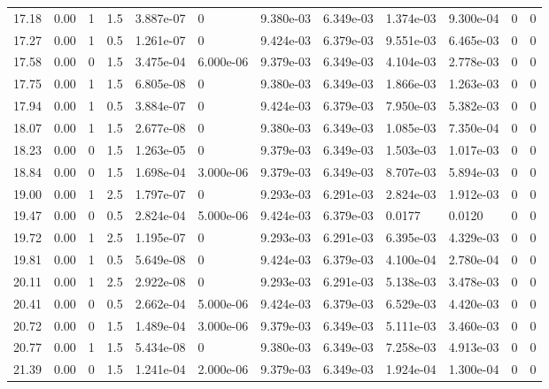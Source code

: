 \documentclass[preview]{standalone}
\begin{document}
{{{\begin{tabular}{L{1.2cm}C{1.2cm} C{0.3cm}C{0.5cm} C{1.4cm}C{1.4cm} C{1.4cm}C{1.4cm} C{1.6cm}C{1.6cm} C{1.6cm}C{1.6cm}}
  17.18  &  0.00  & 1     & 1.5 &  3.887e-07  & 0  &  9.380e-03&   6.349e-03& 1.374e-03 & 9.300e-04   &  0 & 0  \\ 
  17.27  &  0.00  & 1     & 0.5 &  1.261e-07  & 0  &  9.424e-03&   6.379e-03& 9.551e-03 & 6.465e-03   &  0 & 0  \\ 
  17.58  &  0.00  & 0     & 1.5 &  3.475e-04  & 6.000e-06  &  9.379e-03&   6.349e-03& 4.104e-03 & 2.778e-03   &  0 & 0  \\ 
  17.75  &  0.00  & 1     & 1.5 &  6.805e-08  & 0  &  9.380e-03&   6.349e-03& 1.866e-03 & 1.263e-03   &  0 & 0  \\ 
  17.94  &  0.00  & 1     & 0.5 &  3.884e-07  & 0  &  9.424e-03&   6.379e-03& 7.950e-03 & 5.382e-03   &  0 & 0  \\ 
  18.07  &  0.00  & 1     & 1.5 &  2.677e-08  & 0  &  9.380e-03&   6.349e-03& 1.085e-03 & 7.350e-04   &  0 & 0  \\ 
  18.23  &  0.00  & 0     & 1.5 &  1.263e-05  & 0  &  9.379e-03&   6.349e-03& 1.503e-03 & 1.017e-03   &  0 & 0  \\ 
  18.84  &  0.00  & 0     & 1.5 &  1.698e-04  & 3.000e-06  &  9.379e-03&   6.349e-03& 8.707e-03 & 5.894e-03   &  0 & 0  \\ 
  19.00  &  0.00  & 1     & 2.5 &  1.797e-07  & 0  &  9.293e-03&   6.291e-03& 2.824e-03 & 1.912e-03   &  0 & 0  \\ 
  19.47  &  0.00  & 0     & 0.5 &  2.824e-04  & 5.000e-06  &  9.424e-03&   6.379e-03& 0.0177 & 0.0120   &  0 & 0  \\ 
  19.72  &  0.00  & 1     & 2.5 &  1.195e-07  & 0  &  9.293e-03&   6.291e-03& 6.395e-03 & 4.329e-03   &  0 & 0  \\ 
  19.81  &  0.00  & 1     & 0.5 &  5.649e-08  & 0  &  9.424e-03&   6.379e-03& 4.100e-04 & 2.780e-04   &  0 & 0  \\ 
  20.11  &  0.00  & 1     & 2.5 &  2.922e-08  & 0  &  9.293e-03&   6.291e-03& 5.138e-03 & 3.478e-03   &  0 & 0  \\ 
  20.41  &  0.00  & 0     & 0.5 &  2.662e-04  & 5.000e-06  &  9.424e-03&   6.379e-03& 6.529e-03 & 4.420e-03   &  0 & 0  \\ 
  20.72  &  0.00  & 0     & 1.5 &  1.489e-04  & 3.000e-06  &  9.379e-03&   6.349e-03& 5.111e-03 & 3.460e-03   &  0 & 0  \\ 
  20.77  &  0.00  & 1     & 1.5 &  5.434e-08  & 0  &  9.380e-03&   6.349e-03& 7.258e-03 & 4.913e-03   &  0 & 0  \\ 
  21.39  &  0.00  & 0     & 1.5 &  1.241e-04  & 2.000e-06  &  9.379e-03&   6.349e-03& 1.924e-04 & 1.300e-04   &  0 & 0  \\ 

\end{tabular}}}}
\end{document}
